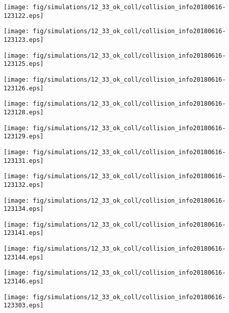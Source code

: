 \texttt{[image: fig/simulations/12\_33\_ok\_coll/collision\_info20180616-123122.eps]}

\texttt{[image: fig/simulations/12\_33\_ok\_coll/collision\_info20180616-123123.eps]}

\texttt{[image: fig/simulations/12\_33\_ok\_coll/collision\_info20180616-123125.eps]}

\texttt{[image: fig/simulations/12\_33\_ok\_coll/collision\_info20180616-123126.eps]}

\texttt{[image: fig/simulations/12\_33\_ok\_coll/collision\_info20180616-123128.eps]}

\texttt{[image: fig/simulations/12\_33\_ok\_coll/collision\_info20180616-123129.eps]}

\texttt{[image: fig/simulations/12\_33\_ok\_coll/collision\_info20180616-123131.eps]}

\texttt{[image: fig/simulations/12\_33\_ok\_coll/collision\_info20180616-123132.eps]}

\texttt{[image: fig/simulations/12\_33\_ok\_coll/collision\_info20180616-123134.eps]}

\texttt{[image: fig/simulations/12\_33\_ok\_coll/collision\_info20180616-123141.eps]}

\texttt{[image: fig/simulations/12\_33\_ok\_coll/collision\_info20180616-123144.eps]}

\texttt{[image: fig/simulations/12\_33\_ok\_coll/collision\_info20180616-123146.eps]}

\texttt{[image: fig/simulations/12\_33\_ok\_coll/collision\_info20180616-123303.eps]}

